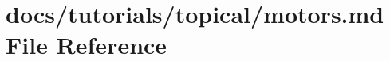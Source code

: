 \hypertarget{motors_8md}{}\section{docs/tutorials/topical/motors.md File Reference}
\label{motors_8md}
